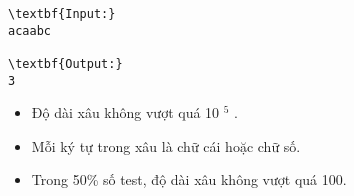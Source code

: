 \begin{verbatim}
\textbf{Input:}
acaabc

\textbf{Output:}
3\end{verbatim}
\begin{itemize}
	\item Độ dài xâu không vượt quá 10 $^ 5 $ .
	\item Mỗi ký tự trong xâu là chữ cái hoặc chữ số.
	\item Trong 50\% số test, độ dài xâu không vượt quá 100.
\end{itemize}